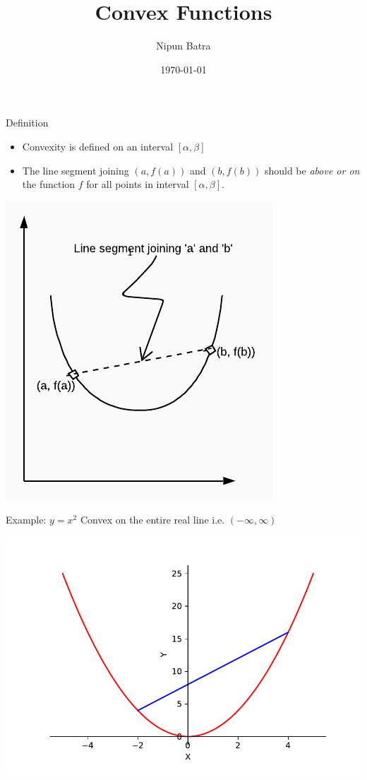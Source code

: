 \documentclass{beamer}
\title{Convex Functions}
\date{\today}
\author{Nipun Batra}
\institute{IIT Gandhinagar}
\begin{document}
	\maketitle

	\begin{frame}{Definition}
	\begin{itemize}
	\item Convexity is defined on an interval $[\alpha,\beta]$
	\item The line segment joining $(a,f(a))$ and $(b, f(b))$ should be \textit{above or on} the function $f$ for all points in interval $[\alpha,\beta]$.
	\end{itemize}
	\begin{center}
	\includegraphics[scale=0.8]{fig1}
	\end{center}
	\end{frame}
	
	\begin{frame}{Example: $y = x^2$}
	Convex on the entire real line i.e. $(-\infty, \infty)$
	\begin{center}
	\includegraphics[scale=0.5]{y-x2}
	\end{center}
	\end{frame}
\end{document}
